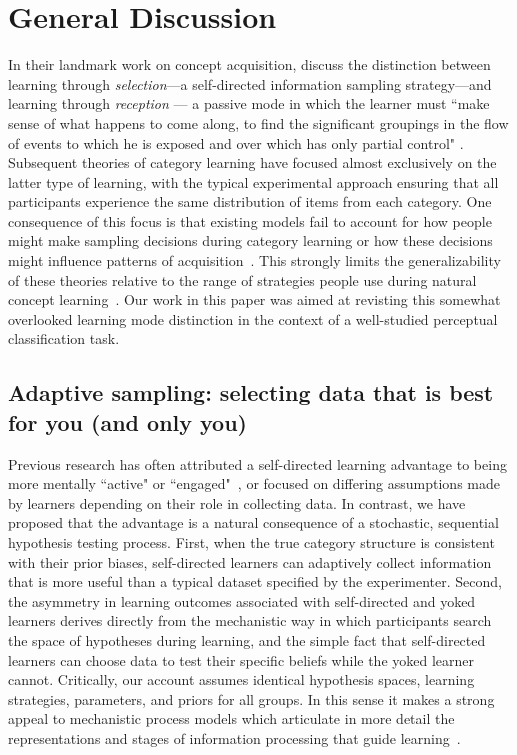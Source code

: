 \documentclass[3p,twocolumn,authoryear,10pt]{elsarticle}
\begin{document}
\section{General Discussion}
In their landmark work on concept acquisition, \citet{Bruner:1956p13030} discuss the distinction between learning through \textit{selection}---a self-directed information sampling strategy---and learning through \textit{reception} --- a passive mode in which the learner must ``make sense of what happens to come along, to find the significant groupings in the flow of events to which he is exposed and over which has only partial control" \citep[][p.126]{Bruner:1956p13030}. Subsequent theories of category learning have focused almost exclusively on the latter type of learning, with the typical experimental approach ensuring that all participants experience the same distribution of items from each category. One consequence of this focus is that existing models fail to account for how people might make sampling decisions during category learning or how these decisions might influence patterns of acquisition~\citep{Gigerenzer:2006lt}.  This strongly limits the generalizability of these theories relative to the range of strategies people use during natural concept learning~\citep{markman2003category}.  Our work in this paper was aimed at revisting this somewhat overlooked learning mode distinction in the context of a well-studied perceptual classification task.


\subsection{Adaptive sampling: selecting data that is best for you (and only you)}

Previous research has often attributed a self-directed learning advantage to being more mentally ``active" or ``engaged"~\citep{bruner1961act}, or focused on differing assumptions made by learners depending on their role in collecting data. In contrast, we have proposed that the advantage is a natural consequence of a stochastic, sequential hypothesis testing process. First, when the true category structure is consistent with their prior biases, self-directed learners can adaptively collect information that is more useful than a typical dataset specified by the experimenter. Second, the asymmetry in learning outcomes associated with self-directed and yoked learners derives directly from the mechanistic way in which participants search the space of hypotheses during learning, and the simple fact that self-directed learners can choose data to test their specific beliefs while the yoked learner cannot. Critically, our account assumes identical hypothesis spaces, learning strategies, parameters, and priors for all groups. In this sense it makes a strong appeal to mechanistic process models which articulate in more detail the representations and stages of information processing that guide learning~\citep{Sakamoto:2008ay}.  
\end{document}
